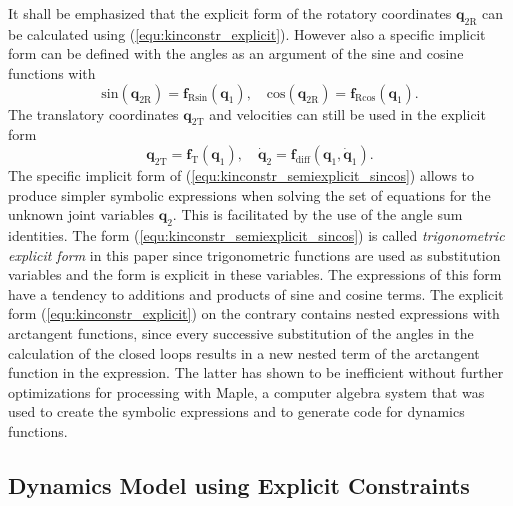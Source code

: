 \documentclass{svproc}
\newcommand{\bm}[1]{\boldsymbol{#1}}
\begin{document}
It shall be emphasized that the explicit form of the rotatory coordinates $\bm{q}_{2\mathrm{R}}$ can be calculated using (\ref{equ:kinconstr_explicit}).
However also a specific implicit form can be defined with the angles as an argument of the sine and cosine functions with
%
\begin{equation}
\mathrm{sin}(\bm{q}_{2\mathrm{R}}) = \bm{f}_{\mathrm{R}\mathrm{sin}}(\bm{q}_1),
\quad
\mathrm{cos}(\bm{q}_{2\mathrm{R}}) = \bm{f}_{\mathrm{R}\mathrm{cos}}(\bm{q}_1). \label{equ:kinconstr_semiexplicit_sincos}
\end{equation}
%
The translatory coordinates $\bm{q}_{2\mathrm{T}}$ and velocities can still be used in the explicit form
%
\vspace{-0.2cm}
\begin{equation}
\bm{q}_{2\mathrm{T}} = \bm{f}_{\mathrm{T}}(\bm{q}_{1}), 
\quad 
\dot{\bm{q}}_{2} = \bm{f}_{\mathrm{diff}}(\bm{q}_{1},\dot{\bm{q}}_{1}). \label{equ:kinconstr_semiexplicit_diff_transl}
\end{equation}
%
The specific implicit form of (\ref{equ:kinconstr_semiexplicit_sincos}) allows to produce simpler symbolic expressions when solving the set of equations for the unknown joint variables $\bm{q}_{2}$. 
This is facilitated by the use of the angle sum identities.
The form  (\ref{equ:kinconstr_semiexplicit_sincos}) is called \emph{trigonometric explicit form} in this paper since trigonometric functions are used as substitution variables and the form is explicit in these variables.
The expressions of this form have a tendency to additions and products of sine and cosine terms.
The explicit form (\ref{equ:kinconstr_explicit}) on the contrary contains nested expressions with arctangent functions, since every successive substitution of the angles in the calculation of the closed loops results in a new nested term of the arctangent function in the expression.
The latter has shown to be inefficient without further optimizations for processing with Maple, a computer algebra system that was used to create the symbolic expressions and to generate code for dynamics functions. %

\subsection{Dynamics Model using Explicit Constraints}
\label{sec:Lagrange2Elim}
\end{document}

